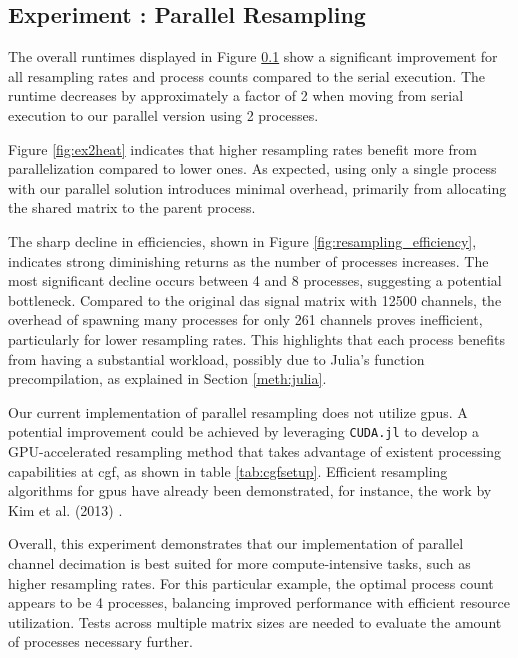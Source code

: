 \subsection{Experiment : Parallel Resampling}

\label{fig:resampling-benchmark}
The overall runtimes displayed in Figure \ref{fig:resampling-benchmark} show a significant improvement for all resampling rates and process counts compared to the serial execution. The runtime decreases by approximately a factor of 2 when moving from serial execution to our parallel version using 2 processes.

Figure \ref{fig:ex2heat} indicates that higher resampling rates benefit more from parallelization compared to lower ones. As expected, using only a single process with our parallel solution introduces minimal overhead, primarily from allocating the shared matrix to the parent process.

The sharp decline in efficiencies, shown in Figure \ref{fig:resampling_efficiency}, indicates strong diminishing returns as the number of processes increases. The most significant decline occurs between 4 and 8 processes, suggesting a potential bottleneck. Compared to the original \acrshort{das} signal matrix with 12500 channels, the overhead of spawning many processes for only 261 channels proves inefficient, particularly for lower resampling rates. This highlights that each process benefits from having a substantial workload, possibly due to Julia's function precompilation, as explained in Section \ref{meth:julia}. 

Our current implementation of parallel resampling does not utilize \acrshort{gpu}s. A potential improvement could be achieved by leveraging \texttt{CUDA.jl} to develop a GPU-accelerated resampling method that takes advantage of existent processing capabilities at \acrshort{cgf}, as shown in table \ref{tab:cgfsetup}. Efficient resampling algorithms for \acrshort{gpu}s have already been demonstrated, for instance, the work by Kim et al. (2013) \cite{kim2013efficient}.

Overall, this experiment demonstrates that our implementation of parallel channel decimation is best suited for more compute-intensive tasks, such as higher resampling rates. For this particular example, the optimal process count appears to be 4 processes, balancing improved performance with efficient resource utilization. Tests across multiple matrix sizes are needed to evaluate the amount of processes necessary further.